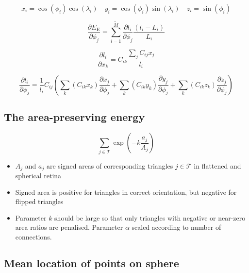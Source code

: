 \documentclass{article}
\begin{document}
\begin{displaymath}
  x_i = \cos(\phi_i)\cos(\lambda_i) \quad 
  y_i = \cos(\phi_i)\sin(\lambda_i) \quad
  z_i = \sin(\phi_i)
\end{displaymath}

\begin{displaymath}
  \frac{\partial E_\mathrm{E}}{\partial \phi_j} 
  = \sum_{i=1}^{\tilde M} \frac{\partial l_i}{\partial \phi_j}
  \frac{(l_i - L_i)}{L_i}  
\end{displaymath}

\begin{displaymath}
  \frac{\partial l_i}{\partial x_k} = C_{ik}\frac{\sum_jC_{ij}x_j}{l_i}
\end{displaymath}

\begin{displaymath}
  \frac{\partial l_i}{\partial \phi_j} = \frac{1}{l_i}
    C_{ij}\left(
      \sum_k(C_{ik}x_k)\frac{\partial x_j}{\partial \phi_j} +
      \sum_k(C_{ik}y_k)\frac{\partial y_j}{\partial \phi_j} +
      \sum_k(C_{ik}z_k)\frac{\partial z_j}{\partial \phi_j} 
    \right)
\end{displaymath}

\subsection{The area-preserving energy}
\label{fold-sphere:sec:area-pres-energy}

\begin{displaymath}
  \sum_{j\in\mathcal{T}} \exp\left(-k\frac{a_j}{A_j}\right)
\end{displaymath}
\begin{itemize}
\item $A_j$ and $a_j$ are signed areas of corresponding triangles
  $j\in\mathcal{T}$ in flattened and spherical retina
\item Signed area is positive for triangles in correct orientation,
  but negative for flipped triangles
\item Parameter $k$ should be large so that only triangles with
  negative or near-zero area ratios are penalised. Parameter $\alpha$
  scaled according to number of connections.
\end{itemize}

\subsection{Mean location of points on sphere}
\label{fold-sphere:sec:mean-location-points}
\end{document}
